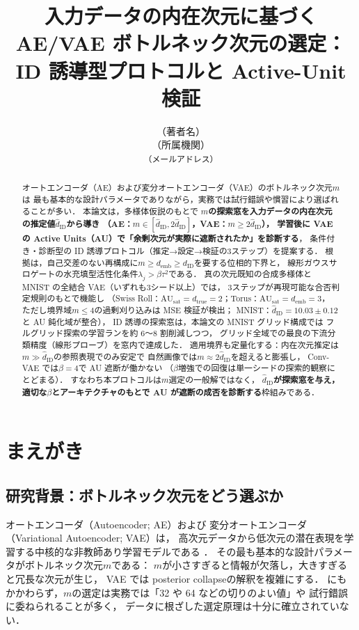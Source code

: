 \documentclass[11pt,a4paper]{jsarticle}
\title{入力データの内在次元に基づく AE/VAE ボトルネック次元の選定：\\
ID 誘導型プロトコルと Active-Unit 検証}
\author{（著者名）\\
{\small （所属機関）}\\
{\small \texttt{（メールアドレス）}}}
\date{}
\newcommand{\dID}{d_{\mathrm{ID}}}
\newcommand{\hatdID}{\hat{d}_{\mathrm{ID}}}
\newcommand{\dtrue}{d_{\mathrm{true}}}
\newcommand{\AUsat}{\mathrm{AU}_{\mathrm{sat}}}
\newcommand{\demb}{d_{\mathrm{emb}}}
\begin{document}
\maketitle

\begin{abstract}
オートエンコーダ（AE）および変分オートエンコーダ（VAE）のボトルネック次元$m$は
最も基本的な設計パラメータでありながら，実務では試行錯誤や慣習により選ばれることが多い．
本論文は，多様体仮説のもとで
\textbf{$m$の探索窓を入力データの内在次元の推定値$\hatdID$から導き
（AE：$m \in [\hatdID, 2\hatdID]$，VAE：$m \geq 2\hatdID$），
学習後に VAE の Active Units（AU）で「余剰次元が実際に遮断されたか」を診断する}，
条件付き・診断型の ID 誘導プロトコル（推定→設定→検証の3ステップ）を提案する．
根拠は，自己交差のない再構成に$m \geq \demb \geq \dID$を要する位相的下界と，
線形ガウスサロゲートの水充填型活性化条件$\lambda_j > \beta\tau^2$である．
真の次元既知の合成多様体と MNIST の全結合 VAE（いずれも3シード以上）では，
3ステップが再現可能な合否判定規則のもとで機能し
（Swiss Roll：$\AUsat = \dtrue = 2$；Torus：$\AUsat = \demb = 3$，
ただし境界域$m \leq 4$の過剰刈り込みは MSE 検証が検出；
MNIST：$\hatdID = 10.03 \pm 0.12$と AU 鈍化域が整合），
ID 誘導の探索窓は，本論文の MNIST グリッド構成では
フルグリッド探索の学習ランを約 6〜8 割削減しつつ，
グリッド全域での最良の下流分類精度（線形プローブ）を窓内で達成した．
適用境界も定量化する：内在次元推定は$m \gg \hatdID$の参照表現でのみ安定で
自然画像では$m \approx 2\hatdID$を超えると膨張し，
Conv-VAE では$\beta = 4$で AU 遮断が働かない
（$\beta$増強での回復は単一シードの探索的観察にとどまる）．
すなわち本プロトコルは$m$選定の一般解ではなく，
\textbf{$\hatdID$が探索窓を与え，適切な$\beta$とアーキテクチャのもとで
AU が遮断の成否を診断する}枠組みである．
\end{abstract}

\section{まえがき}\label{sec:intro}

\subsection{研究背景：ボトルネック次元をどう選ぶか}\label{sec:intro_bg}

オートエンコーダ（Autoencoder; AE）および
変分オートエンコーダ（Variational Autoencoder; VAE）\cite{kingma2014vae}は，
高次元データから低次元の潜在表現を学習する中核的な非教師あり学習モデルである
\cite{bengio2013representation}．
その最も基本的な設計パラメータがボトルネック次元$m$である：
$m$が小さすぎると情報が欠落し，大きすぎると冗長な次元が生じ，
VAE では posterior collapse\cite{lucas2019elbo}の解釈を複雑にする．
にもかかわらず，$m$の選定は実務では「32 や 64 などの切りのよい値」や
試行錯誤に委ねられることが多く，
データに根ざした選定原理は十分に確立されていない．
\end{document}
